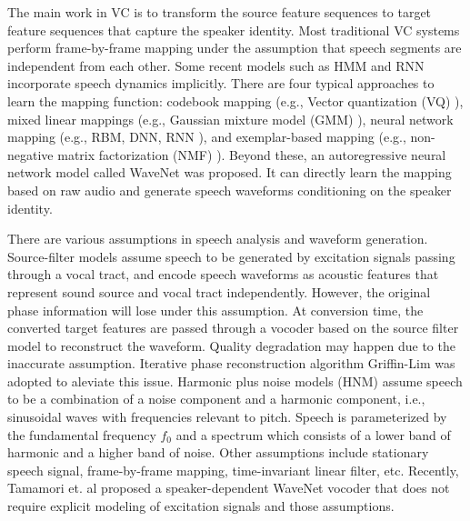 \documentclass{article}
\begin{document}
The main work in VC is to transform the source feature sequences to target feature sequences that capture the speaker identity. Most traditional VC systems perform frame-by-frame mapping under the assumption that speech segments are independent from each other. Some recent models such as HMM and RNN incorporate speech dynamics implicitly. There are four typical approaches to learn the mapping function: codebook mapping (e.g., Vector quantization (VQ) \cite{196671}), mixed linear mappings (e.g., Gaussian mixture model (GMM) \cite{661472}), neural network mapping (e.g., RBM, DNN, RNN \cite{DBLP:conf/interspeech/NakashikaTA14}), and exemplar-based mapping (e.g., non-negative matrix factorization (NMF) \cite{6843941}). Beyond these, an autoregressive neural network model called WaveNet \cite{van2016wavenet} was proposed. It can directly learn the mapping based on raw audio and generate speech waveforms conditioning on the speaker identity.

There are various assumptions in speech analysis and waveform generation. Source-filter models assume speech to be generated by excitation signals passing through a vocal tract, and encode speech waveforms as acoustic features that represent sound source and vocal tract independently. However, the original phase information will lose under this assumption. At conversion time, the converted target features are passed through a vocoder based on the source filter model to reconstruct the waveform. Quality degradation may happen due to the inaccurate assumption. Iterative phase reconstruction algorithm Griffin-Lim \cite{1172092} was adopted to aleviate this issue. Harmonic plus noise models (HNM) \cite{DBLP:conf/interspeech/ErroSNH11} assume speech to be a combination of a noise component and a harmonic component, i.e., sinusoidal waves with frequencies relevant to pitch. Speech is parameterized by the fundamental frequency $f_0$ and a spectrum which consists of a lower band of harmonic and a higher band of noise. Other assumptions include
stationary speech signal, %
frame-by-frame mapping, %
time-invariant linear filter, etc. Recently, Tamamori et. al \cite{tamamori2017speaker} proposed a speaker-dependent WaveNet vocoder that does not require explicit modeling of excitation signals and those assumptions.

\end{document}
